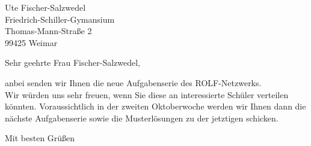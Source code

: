 \documentclass{letter}
\begin{document}
\address{c/o Aaron Wild \\ Europaring 8\\ 53123 Bonn}



\begin{letter}
{Ute Fischer-Salzwedel\\
Friedrich-Schiller-Gymansium\\
Thomas-Mann-Straße 2\\
99425 Weimar
}

\date{\today}

\opening{Sehr geehrte Frau Fischer-Salzwedel,}

anbei senden wir Ihnen die neue Aufgabenserie des ROLF-Netzwerks.\\
Wir würden uns sehr freuen, wenn Sie diese an interessierte Schüler verteilen könnten. Voraussichtlich in der zweiten Oktoberwoche werden wir Ihnen dann die nächste Aufgabenserie sowie die Musterlösungen zu der jetztigen schicken. 






\closing{Mit besten Grüßen}





\end{letter}
\end{document}
